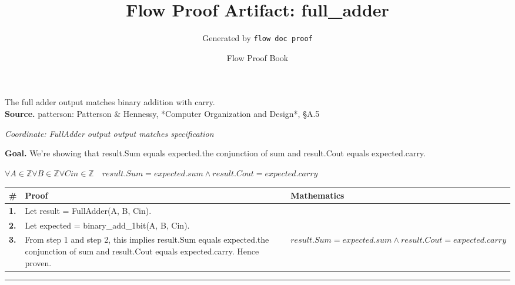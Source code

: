 \documentclass[11pt]{article}
\title{Flow Proof Artifact: full\_adder}
\author{Generated by \texttt{flow doc proof}}
\date{Flow Proof Book}
\theoremstyle{definition}
\begin{document}
\maketitle
The full adder output matches binary addition with carry.\\[0.5em]
\textbf{Source.} patterson: Patterson \& Hennessy, *Computer Organization and Design*, §A.5\\[0.5em]
\bigskip
{}\par
\smallskip\noindent\textit{Coordinate: FullAdder \cdot output \cdot output matches specification}\par
\medskip
\noindent\textbf{Goal.} We're showing that result.Sum equals expected.the conjunction of sum and result.Cout equals expected.carry.\par
\noindent$\displaystyle \forall A \in \mathbb{Z} \forall B \in \mathbb{Z} \forall Cin \in \mathbb{Z}\quad result.Sum = expected.sum \land result.Cout = expected.carry$\par
\medskip
\noindent
\begin{tabular}{@{} >{\raggedright\arraybackslash}p{} >{\raggedright\arraybackslash}p{} >{\raggedleft\arraybackslash}p{} @{}}
\textbf{\#} & \textbf{Proof} & \textbf{Mathematics} \\
\midrule
\textbf{1.} & Let result = FullAdder(A, B, Cin). & \\[0.45em]
\textbf{2.} & Let expected = binary\_add\_1bit(A, B, Cin). & \\[0.45em]
\textbf{3.} & From step 1 and step 2, this implies result.Sum equals expected.the conjunction of sum and result.Cout equals expected.carry. Hence proven. & $\displaystyle result.Sum = expected.sum \land result.Cout = expected.carry$ \\[0.45em]
\bottomrule
\end{tabular}
\label{thm:FullAdder-output-output_matches_specification}
\par\medskip\hrule
\end{document}
